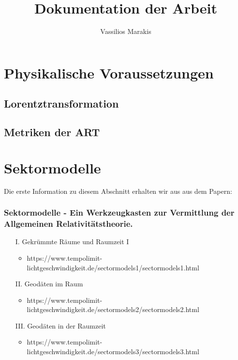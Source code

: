\documentclass{article}
\begin{document}
\title{Dokumentation der Arbeit}
\author{Vassilios Marakis}
\maketitle


\section{Physikalische Voraussetzungen}

\subsection{Lorentztransformation}


\subsection{Metriken der ART}
\section{Sektormodelle}

Die erste Information zu diesem Abschnitt erhalten wir aus aus dem Papern: 

\subsubsection*{Sektormodelle - Ein Werkzeugkasten zur Vermittlung der Allgemeinen Relativitätstheorie.}

\begin{itemize}
\item[I.]	Gekrümmte Räume und Raumzeit  I
\begin{itemize}
\item https://www.tempolimit-lichtgeschwindigkeit.de/sectormodels1/sectormodels1.html
\end{itemize}
\item[II.]	Geodäten im Raum
\begin{itemize}
\item https://www.tempolimit-lichtgeschwindigkeit.de/sectormodels2/sectormodels2.html
\end{itemize}
\item[III.]	Geodäten in der Raumzeit
\begin{itemize}
\item https://www.tempolimit-lichtgeschwindigkeit.de/sectormodels3/sectormodels3.html
\end{itemize}
\end{itemize}
\end{document}
